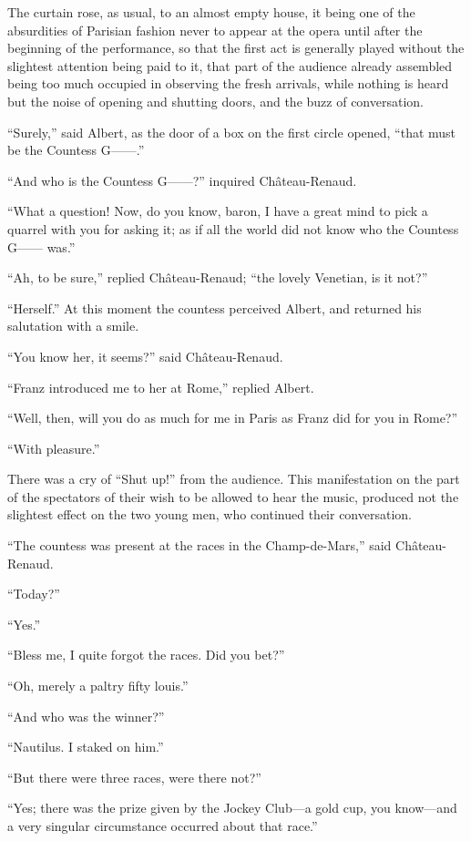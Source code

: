 The curtain rose, as usual, to an almost empty house, it being one of
the absurdities of Parisian fashion never to appear at the opera until
after the beginning of the performance, so that the first act is
generally played without the slightest attention being paid to it, that
part of the audience already assembled being too much occupied in
observing the fresh arrivals, while nothing is heard but the noise of
opening and shutting doors, and the buzz of conversation.

“Surely,” said Albert, as the door of a box on the first circle opened,
“that must be the Countess G——.”

“And who is the Countess G——?” inquired Château-Renaud.

“What a question! Now, do you know, baron, I have a great mind to pick
a quarrel with you for asking it; as if all the world did not know who
the Countess G—— was.”

“Ah, to be sure,” replied Château-Renaud; “the lovely Venetian, is it
not?”

“Herself.” At this moment the countess perceived Albert, and returned
his salutation with a smile.

“You know her, it seems?” said Château-Renaud.

“Franz introduced me to her at Rome,” replied Albert.

“Well, then, will you do as much for me in Paris as Franz did for you
in Rome?”

“With pleasure.”

There was a cry of “Shut up!” from the audience. This manifestation on
the part of the spectators of their wish to be allowed to hear the
music, produced not the slightest effect on the two young men, who
continued their conversation.

“The countess was present at the races in the Champ-de-Mars,” said
Château-Renaud.

“Today?”

“Yes.”

“Bless me, I quite forgot the races. Did you bet?”

“Oh, merely a paltry fifty louis.”

“And who was the winner?”

“Nautilus. I staked on him.”

“But there were three races, were there not?”

“Yes; there was the prize given by the Jockey Club—a gold cup, you
know—and a very singular circumstance occurred about that race.”

